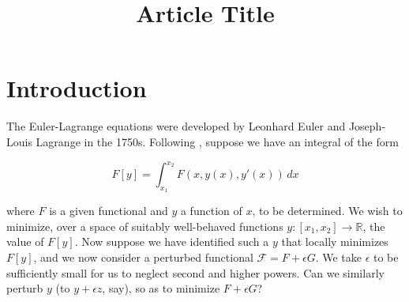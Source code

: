 \documentclass[pdflatex,sn-mathphys-num]{sn-jnl}%
\theoremstyle{thmstyleone}%
\theoremstyle{thmstyletwo}%
\theoremstyle{thmstylethree}%
\begin{document}
\newcommand{\di}[2]{\frac{\partial{#1}}{\partial{#2}}}
\newcommand{\el}[1]{\frac{d}{dx}\di{#1}{y'} - \di{#1}{y}}
\title[Article Title]{Article Title}


\author{ }









\maketitle

\section{Introduction}\label{sec1}


The Euler-Lagrange equations were developed by Leonhard Euler and
Joseph-Louis Lagrange in the 1750s.  Following \citep{jeffreys1972},
suppose we have an integral of the form

\begin{equation}
F[y] = \int_{x_1}^{x_2} F(x,y(x),y'(x))\,dx
\end{equation}

\noindent where $F$ is a given functional and $y$ a function of $x$,
to be determined.  We wish to minimize, over a space of suitably
well-behaved functions
$y\colon\left[x_1,x_2\right]\longrightarrow\mathbb{R}$, the value of
$F[y]$.  Now suppose we have identified such a $y$ that locally
minimizes $F[y]$, and we now consider a perturbed functional
$\mathcal{F}=F+\epsilon G$.  We take $\epsilon$ to be sufficiently
small for us to neglect second and higher powers.  Can we similarly
perturb $y$ (to $y+\epsilon z$, say), so as to minimize $F+\epsilon
G$?
\end{document}
